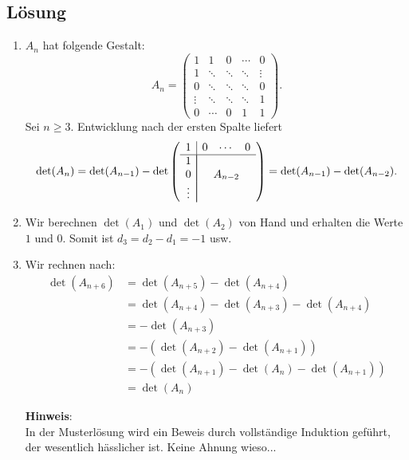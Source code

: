 \subsection{Lösung}
\begin{enumerate}
	\item \( A_n \) hat folgende Gestalt:
		\begin{equation*}
			A_n = \begin{pmatrix}
				1 & 1 & 0 & \cdots & 0 \\
				1 & \ddots & \ddots & \ddots & \vdots \\
				0 & \ddots & \ddots & \ddots & 0 \\
				\vdots & \ddots & \ddots & \ddots & 1 \\
				0 & \cdots & 0 & 1 & 1
			\end{pmatrix}\text{.}
		\end{equation*}
		Sei \( n \geq 3 \). Entwicklung nach der ersten Spalte liefert
		\begin{equation*}
			\det(A_n) = \det(A_{n-1}) - \det \left( 
			\begin{array}{c|ccc}
				1 & 0 & \cdots & 0 \\
				\hline
				1 & \multicolumn{3}{|c}{\multirow{3}{*}{\( A_{n-2} \)}} \\
				0 & \multicolumn{3}{|c}{} \\
				\vdots & \multicolumn{3}{|c}{}
			\end{array}
			 \right) = \det(A_{n-1}) - \det(A_{n-2})\text{.}
		\end{equation*}
	\item Wir berechnen \( \det(A_1) \) und \( \det(A_2) \) von Hand und erhalten die Werte \( 1 \) und \( 0 \). Somit ist \( d_3 = d_2 - d_1 = -1 \) usw.

	\item Wir rechnen nach:
	\begin{align*}
		\det(A_{n+6}) &= \det(A_{n+5}) - \det(A_{n+4}) \\
		 &= \det(A_{n+4}) - \det(A_{n+3}) - \det(A_{n+4}) \\
		 &= -\det(A_{n+3}) \\
		 &= -(\det(A_{n+2}) - \det(A_{n+1})) \\
		 &= -(\det(A_{n+1}) - \det(A_n) - \det(A_{n+1})) \\
		 &= \det(A_n)
	\end{align*}

	\begin{remark}
		\textbf{Hinweis}: \\
		In der Musterlösung wird ein Beweis durch vollständige Induktion geführt, der wesentlich hässlicher ist. Keine Ahnung wieso...
	\end{remark}

\end{enumerate}


